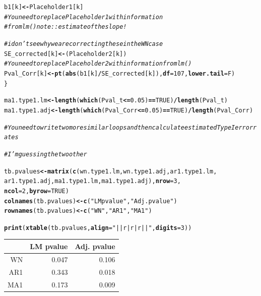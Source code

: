\documentclass[11pt]{article}\usepackage[]{graphicx}\usepackage[]{color}
\makeatletter
\newcommand{\hlnum}[1]{\textcolor[rgb]{0,0,0}{#1}}%
\newcommand{\hlstr}[1]{\textcolor[rgb]{0,0,0}{#1}}%
\newcommand{\hlcom}[1]{\textcolor[rgb]{0.4,0.4,0.4}{\textit{#1}}}%
\newcommand{\hlopt}[1]{\textcolor[rgb]{0,0,0}{\textbf{#1}}}%
\newcommand{\hlstd}[1]{\textcolor[rgb]{0,0,0}{#1}}%
\newcommand{\hlkwb}[1]{\textcolor[rgb]{0,0,0}{\textbf{#1}}}%
\newcommand{\hlkwc}[1]{\textcolor[rgb]{0,0,0}{\textbf{#1}}}%
\newcommand{\hlkwd}[1]{\textcolor[rgb]{0,0,0}{\textbf{#1}}}%
\newenvironment{kframe}{%
 \def\at@end@of@kframe{}%
 \ifinner\ifhmode%
  \def\at@end@of@kframe{\end{minipage}}%
  \begin{minipage}{\columnwidth}%
 \fi\fi%
 \def\FrameCommand##1{\hskip\@totalleftmargin \hskip-\fboxsep
 \colorbox{shadecolor}{##1}\hskip-\fboxsep
     \hskip-\linewidth \hskip-\@totalleftmargin \hskip\columnwidth}%
 \MakeFramed {\advance\hsize-\width
   \@totalleftmargin\z@ \linewidth\hsize
   \@setminipage}}%
 {\par\unskip\endMakeFramed%
 \at@end@of@kframe}
\makeatother
\begin{document}
\begin{enumerate}
\begin{enumerate}
\begin{kframe}
\begin{alltt}
\hlstd{b1[k]}\hlkwb{<-}\hlstd{Placeholder1[k]}
\hlcom{# You need to replace Placeholder1 with information}
\hlcom{# from lm() note:: estimate of the slope!}

\hlcom{#i don't see why we are correcting the se in the WN case}
\hlstd{SE_corrected[k]}\hlkwb{<-}\hlstd{(Placeholder2[k])}
\hlcom{#You need to replace Placeholder2 with information from lm()}
\hlstd{Pval_Corr[k]}\hlkwb{<-}\hlkwd{pt}\hlstd{(}\hlkwd{abs}\hlstd{(b1[k]}\hlopt{/}\hlstd{SE_corrected[k]),}\hlkwc{df}\hlstd{=}\hlnum{107}\hlstd{,}\hlkwc{lower.tail}\hlstd{=F)}
\hlstd{\}}

\hlstd{ma1.type1.lm} \hlkwb{<-} \hlkwd{length}\hlstd{(}\hlkwd{which}\hlstd{(Pval_t} \hlopt{<=} \hlnum{0.05}\hlstd{)} \hlopt{==} \hlnum{TRUE}\hlstd{)}\hlopt{/}\hlkwd{length}\hlstd{(Pval_t)}
\hlstd{ma1.type1.adj} \hlkwb{<-} \hlkwd{length}\hlstd{(}\hlkwd{which}\hlstd{(Pval_Corr} \hlopt{<=} \hlnum{0.05}\hlstd{)} \hlopt{==} \hlnum{TRUE}\hlstd{)}\hlopt{/}\hlkwd{length}\hlstd{(Pval_Corr)}

\hlcom{#You need to write two more similar loops and then calculate estimated Type I error rates}

\hlcom{#I'm guessing the two other }

\hlstd{tb.pvalues} \hlkwb{<-} \hlkwd{matrix}\hlstd{(}\hlkwd{c}\hlstd{(wn.type1.lm,wn.type1.adj,ar1.type1.lm,}
                       \hlstd{ar1.type1.adj,ma1.type1.lm,ma1.type1.adj),} \hlkwc{nrow} \hlstd{=} \hlnum{3}\hlstd{,}
                     \hlkwc{ncol} \hlstd{=} \hlnum{2}\hlstd{,} \hlkwc{byrow} \hlstd{=} \hlnum{TRUE}\hlstd{)}
\hlkwd{colnames}\hlstd{(tb.pvalues)} \hlkwb{<-} \hlkwd{c}\hlstd{(}\hlstr{"LM pvalue"}\hlstd{,} \hlstr{"Adj. pvalue"}\hlstd{)}
\hlkwd{rownames}\hlstd{(tb.pvalues)} \hlkwb{<-} \hlkwd{c}\hlstd{(}\hlstr{"WN"}\hlstd{,} \hlstr{"AR1"}\hlstd{,} \hlstr{"MA1"}\hlstd{)}

\hlkwd{print}\hlstd{(}\hlkwd{xtable}\hlstd{(tb.pvalues,} \hlkwc{align} \hlstd{=} \hlstr{"||r|r|r||"}\hlstd{,} \hlkwc{digits} \hlstd{=} \hlnum{3}\hlstd{))}
\end{alltt}
\end{kframe}%
\begin{table}[H]
\centering
\begin{tabular}{||r|r|r||}
  \hline
 & LM pvalue & Adj. pvalue \\ 
  \hline
WN & 0.047 & 0.106 \\ 
  AR1 & 0.343 & 0.018 \\ 
  MA1 & 0.173 & 0.009 \\ 
   \hline
\end{tabular}
\end{table}



\end{enumerate}
\end{enumerate}
\end{document}
